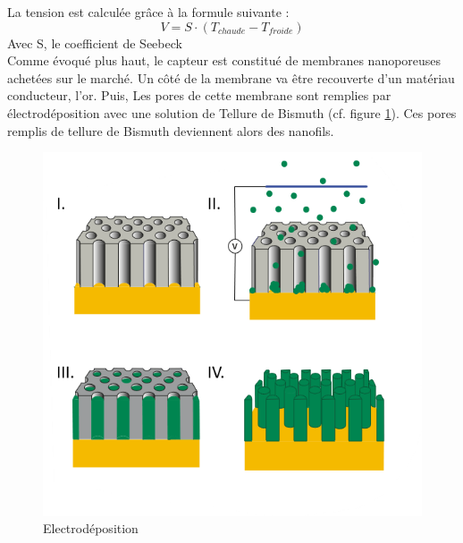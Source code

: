 La tension est calculée grâce à la formule suivante :
\[V = S \cdot (T_{chaude} - T_{froide})\]
Avec S, le coefficient de Seebeck\\
Comme évoqué plus haut, le capteur est constitué de membranes nanoporeuses achetées sur le marché. 
Un côté de la membrane va être recouverte d'un matériau conducteur, l'or. Puis, Les pores de cette membrane sont remplies par 
électrodéposition avec une solution de Tellure de Bismuth (cf. figure \ref{fig:electrodeposition}). Ces pores remplis de tellure de 
Bismuth deviennent alors des nanofils. 
\begin{figure}[H]
    \centering
    \includegraphics[scale = 0.5]{images/Electrodeposition.png}
    \caption{Electrodéposition \cite{ruiz-gomez_electrodeposition_2022}}
    \label{fig:electrodeposition}
\end{figure}

